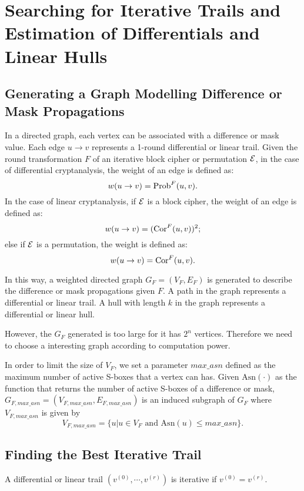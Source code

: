 \section{Searching for Iterative Trails and Estimation of Differentials and Linear Hulls\label{sec:method}}

\subsection{Generating a Graph Modelling Difference or Mask Propagations}

In a directed graph, each vertex can be associated with a difference or mask value. Each edge $u\rightarrow v$ represents a 1-round differential or linear trail. Given the round transformation $F$ of an iterative block cipher or permutation $\mathcal{E}$, in the case of differential cryptanalysis, the weight of an edge is defined as:
\[
    w(u\rightarrow v)=\text{Prob}^{F}(u,v).
\]
In the case of linear cryptanalysis, if $\mathcal{E}$ is a block cipher, the weight of an edge is defined as:
\[
    w(u\rightarrow v)=(\text{Cor}^{F}(u,v))^2;
\]
else if $\mathcal{E}$ is a permutation, the weight is defined as:
\[
    w(u\rightarrow v)=\text{Cor}^{F}(u,v).
\]

In this way, a weighted directed graph $G_{F}=(V_{F},E_{F})$ is generated to describe the difference or mask propagations given $F$. A path in the graph represents a differential or linear trail. A hull with length $k$ in the graph represents a differential or linear hull. 

However, the $G_F$ generated is too large for it has $2^n$ vertices. Therefore we need to choose a interesting graph according to computation power. 

In order to limit the size of $V_F$, we set a parameter $max\_asn$ defined as the maximum number of active S-boxes that a vertex can has. Given $\text{Asn}(\cdot)$ as the function that returns the number of active S-boxes of a difference or mask, $G_{F,max\_asn}=(V_{F,max\_asn},E_{F,max\_asn})$ is an induced subgraph of $G_F$ where $V_{F,max\_asn}$ is given by
\[
    V_{F,max\_asn}=\{u|u\in V_F \text{ and } \text{Asn}(u)\leq max\_asn\}.
\]

\subsection{Finding the Best Iterative Trail}\label{sec:fbit}

\begin{definition}\label{def:it}
	A differential or linear trail $(v^{(0)},\cdots,v^{(r)})$ is iterative if $v^{(0)}=v^{(r)}$.
\end{definition}

